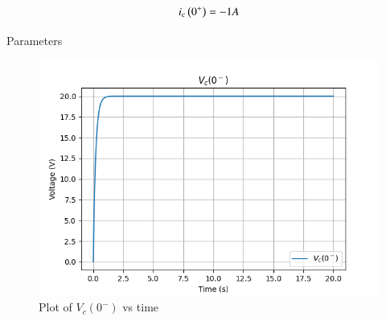 \documentclass[journal,12pt,twocolumn]{IEEEtran}
\begin{document}
\bigskip


\begin{align}
    i_c \left(0^+\right) = -1A
\end{align}

\begin{table}[ht]
    \begin{adjustbox}{width=\columnwidth}
       
    \end{adjustbox}
    \caption{Parameters}
    \label{tab:Gate.ec.44.1}

\end{table}


\begin{figure}[ht]
   \centering
   \includegraphics[width=1.0\columnwidth]{figs/ckt2.png}
   \caption{Plot of $V_c(0^-)$ vs time}
\end{figure}
\end{document}
